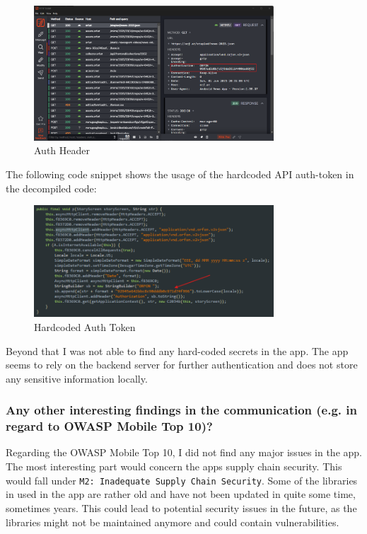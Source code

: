 \documentclass[12pt,a4paper]{article}
\begin{document}
\begin{figure}[H]
\centering
\includegraphics[width=0.8\textwidth]{./screenshots/Auth_header.png}
\caption{Auth Header}
\end{figure}

The following code snippet shows the usage of the hardcoded API auth-token in the decompiled code:

\begin{figure}[H]
\centering
\includegraphics[width=0.8\textwidth]{./screenshots/hardcoded_token.png}
\caption{Hardcoded Auth Token}
\end{figure}

Beyond that I was not able to find any hard-coded secrets in the app. The app seems to rely on the backend server for further authentication and does not store any sensitive information locally.

\subsubsection{Any other interesting findings in the communication (e.g. in regard to OWASP Mobile Top 10)?}

Regarding the OWASP Mobile Top 10, I did not find any major issues in the app.
The most interesting part would concern the apps supply chain security. This would fall under \texttt{M2: Inadequate Supply Chain Security}. Some of the libraries in used in the app are rather old and 
have not been updated in quite some time, sometimes years. This could lead to potential security issues in the future, as the libraries might not be maintained anymore and could contain vulnerabilities.
\end{document}
